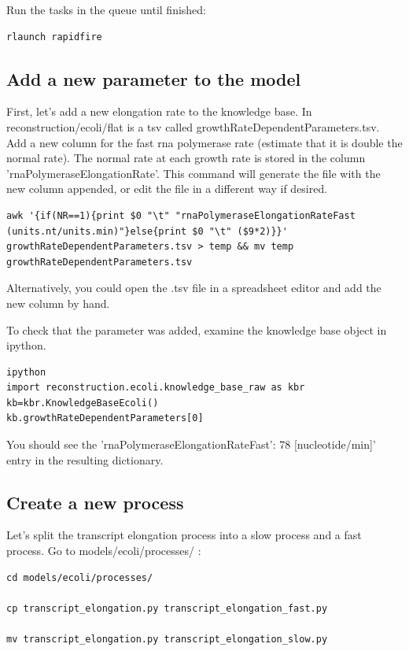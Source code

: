 \documentclass[12pt]{article}
\begin{document}
Run the tasks in the queue until finished:

\begin{lstlisting}
rlaunch rapidfire
\end{lstlisting}



\subsection{Add a new parameter to the model}

First, let’s add a new elongation rate to the knowledge base. In reconstruction/ecoli/flat is a tsv called growthRateDependentParameters.tsv. Add a new column for the fast rna polymerase rate (estimate that it is double the normal rate). The normal rate at each growth rate is stored in the column 'rnaPolymeraseElongationRate'. This command will generate the file with the new column appended, or edit the file in a different way if desired.

\pagebreak

\begin{lstlisting}
awk '{if(NR==1){print $0 "\t" "rnaPolymeraseElongationRateFast (units.nt/units.min)"}else{print $0 "\t" ($9*2)}}' growthRateDependentParameters.tsv > temp && mv temp growthRateDependentParameters.tsv  
\end{lstlisting}

Alternatively, you could open the .tsv file in a spreadsheet editor and add the new column by hand.

To check that the parameter was added, examine the knowledge base object in ipython.

\lstset{language=Python}
\begin{lstlisting}
ipython
import reconstruction.ecoli.knowledge_base_raw as kbr
kb=kbr.KnowledgeBaseEcoli()
kb.growthRateDependentParameters[0]
\end{lstlisting}

You should see the 'rnaPolymeraseElongationRateFast': 78 [nucleotide/min]' entry in the resulting dictionary.

\subsection{Create a new process}

Let’s split the transcript elongation process into a slow process and a fast process. Go to models/ecoli/processes/ :

\lstset{language=bash}
\begin{lstlisting}
cd models/ecoli/processes/

cp transcript_elongation.py transcript_elongation_fast.py

mv transcript_elongation.py transcript_elongation_slow.py
\end{lstlisting}
\end{document}
